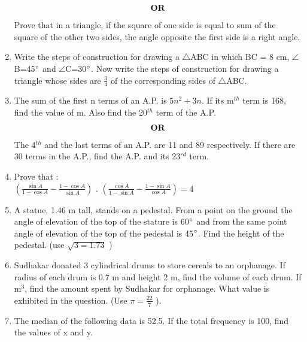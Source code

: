 \documentclass[journal,12pt,twocolumn]{IEEEtran}
\renewcommand\thesection{\arabic{section}}
\begin{document}
\begin{enumerate}[label=\thesection.\arabic*.,ref=\thesection.\theenumi]
\begin{align}
    \centering \vec{OR}\nonumber
\end{align}
Prove that in a triangle, if the square of one side is equal to sum of the square of the other two sides, the angle opposite the first side is a right angle.\\
\item Write the steps of construction for drawing a $\triangle$ABC in which BC = 8 cm, $\angle$B=45$\degree$ and $\angle$C=30$\degree$. Now write the steps of construction for drawing a triangle whose sides are $\frac{3}{4}$ of the corresponding sides of $\triangle$ABC.\\
\item The sum of the first n terms of an A.P. is $5n^2 + 3n$. If its m$^{th}$ term is 168, find the value of m. Also find the 20$^{th}$ term of the A.P.
\begin{align}
    \centering \vec{OR}\nonumber
\end{align}
The 4$^{th}$ and the last terms of an A.P. are 11 and 89 respectively. If there are 30 terms in the A.P., find the A.P. and its 23$^{rd}$ term.\\
\item Prove that : \\ $(\frac{\sin A}{1-\cos A}-\frac{1-\cos A}{\sin A})$ . $(\frac{\cos A}{1-\sin A}-\frac{1-\sin A}{\cos A}) = 4$ \\
\item A statue, 1.46 m tall, stands on a pedestal. From a point on the ground the angle of elevation of the top of the stature is 60$\degree$ and from the same point angle of elevation of the top of the pedestal is 45$\degree$. Find the height of the pedestal. (use $\sqrt{3=1.73}$ ) \\
\item Sudhakar donated 3 cylindrical drums to store cereals to an orphanage. If radius of each drum is 0.7 m and height 2 m, find the volume of each drum. If m$^3$, find the amount spent by Sudhakar for orphanage. What value is exhibited in the question. (Use $\pi = \frac{22}{7}$ ).\\

\item The median of the following data is 52.5. If the total frequency is 100, find the values of x and y.\\
\begin{table}[htb]
	\centering
\end{table}
\end{enumerate}
\end{document}

